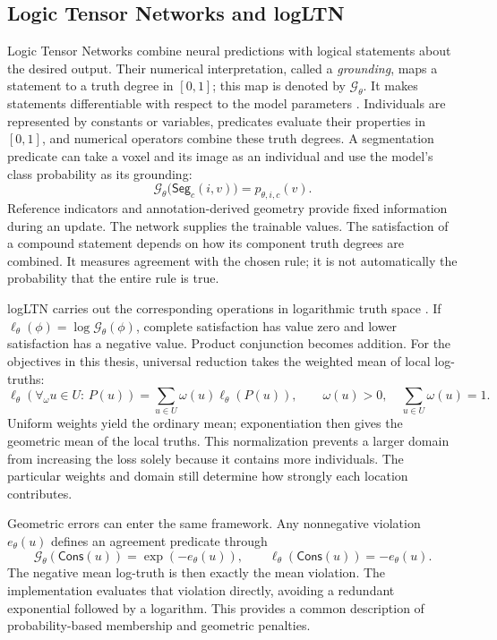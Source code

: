 \documentclass[12pt,a4paper]{article}
\begin{document}
\subsection{Logic Tensor Networks and logLTN}\label{sec:ltn-background}

Logic Tensor Networks combine neural predictions with logical statements
about the desired output. Their numerical interpretation, called a
\emph{grounding}, maps a statement to a truth degree in $[0,1]$; this map
is denoted by $\mathcal G_\theta$. It makes statements differentiable
with respect to the model parameters
\cite{badreddine2022logic}. Individuals are represented by constants or
variables, predicates evaluate their properties in $[0,1]$, and numerical
operators combine these truth degrees. A segmentation predicate can take
a voxel and its image as an individual and use the model's class
probability as its grounding:
\begin{equation}
\mathcal{G}_{\theta}\bigl(\mathsf{Seg}_c(i,v)\bigr)
=p_{\theta,i,c}(v).
\label{eq:segmentation-predicate}
\end{equation}
Reference indicators and annotation-derived geometry provide fixed
information during an update. The network supplies the trainable values.
The satisfaction of a compound statement depends on how its component
truth degrees are combined. It measures agreement with the chosen rule;
it is not automatically the probability that the entire rule is true.

logLTN carries out the corresponding operations in logarithmic truth
space \cite{badreddine2023logltn}. If
$\ell_\theta(\phi)=\log\mathcal G_\theta(\phi)$, complete satisfaction
has value zero and lower satisfaction has a negative value. Product
conjunction becomes addition. For the objectives in this thesis,
universal reduction takes the weighted mean of local log-truths:
\begin{equation}
\ell_{\theta}(\forall_{\omega}u\in U:\,P(u))
=\sum_{u\in U}\omega(u)\ell_{\theta}(P(u)),
\qquad
\omega(u)>0,\quad\sum_{u\in U}\omega(u)=1.
\label{eq:weighted-log-universal}
\end{equation}
Uniform weights yield the ordinary mean; exponentiation then gives the
geometric mean of the local truths. This normalization prevents a larger
domain from increasing the loss solely because it contains more
individuals. The particular weights and domain still determine how
strongly each location contributes.

Geometric errors can enter the same framework. Any nonnegative violation
$e_\theta(u)$ defines an agreement predicate through
\begin{equation}
\mathcal{G}_{\theta}(\mathsf{Cons}(u))=\exp(-e_{\theta}(u)),
\qquad
\ell_{\theta}(\mathsf{Cons}(u))=-e_{\theta}(u).
\label{eq:penalty-predicate}
\end{equation}
The negative mean log-truth is then exactly the mean violation. The
implementation evaluates that violation directly, avoiding a redundant
exponential followed by a logarithm. This provides a common
description of probability-based membership and geometric penalties.
\end{document}
